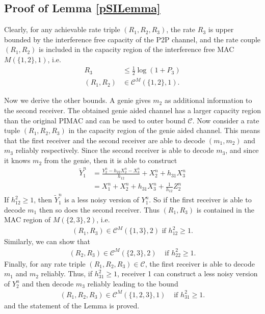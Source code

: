 \documentclass[10pt,conference]{IEEEtran}
\begin{document}







\begin{appendices}



\section{Proof of Lemma \ref{pSILemma}}
\label{pSILemmaProof}
Clearly, for any achievable rate triple $(R_1,R_2,R_3)$, the rate $R_3$ is upper bounded by the interference free capacity of the P2P channel, and the rate couple $(R_1,R_2)$ is included in the  capacity region of the interference free MAC $M(\{1,2\},1)$, i.e. 
\begin{align}
R_3&\leq\frac{1}{2}\log(1+P_3)\\
(R_1,R_2)&\in\mathcal{C}^{M}(\{1,2\},1).
\end{align}

Now we derive the other bounds. A genie gives $m_2$ as additional information to the second receiver. The obtained genie aided channel has a larger capacity region than the original PIMAC and can be used to outer bound $\mathcal{C}$. Now consider a rate tuple $(R_1,R_2,R_3)$ in the capacity region of the genie aided channel. This means that the first receiver and the second receiver are able to decode $(m_1,m_2)$ and $m_3$ reliably respectively. Since the second receiver is able to decode $m_3$, and since it knows $m_2$ from the genie, then it is able to construct 
\begin{align}
\tilde{Y}_1^n&=\frac{Y_2^n-h_{22}X_2^n-X_3^n}{h_{12}}+X_2^n+h_{31}X_3^n\nonumber\\
&=X_1^n+X_2^n+h_{31}X_3^n+\frac{1}{h_{12}}Z_2^n
\end{align}
If $h_{12}^2\geq1$, then $\tilde{Y}_1^n$ is a less noisy version of $Y_1^n$. So if the first receiver is able to decode $m_1$ then so does the second receiver. Thus
$(R_1,R_3)$ is contained in the MAC region of $M(\{2,3\},2)$, i.e. 
\begin{align}
(R_1,R_3)\in\mathcal{C}^{M}(\{1,3\},2)  \text{ if } h_{12}^2\geq1.
\end{align}
Similarly, we can show that
\begin{align}
(R_2,R_3)\in\mathcal{C}^{M}(\{2,3\},2) &\text{ if } h_{22}^2\geq1.
\end{align}
Finally, for any rate triple $(R_1,R_2,R_3)\in\mathcal{C}$, the first receiver is able to decode $m_1$ and $m_2$ reliably. Thus, if $h_{31}^2\geq1$, receiver 1 can construct a less noisy version of $Y_2^n$ and then decode $m_3$ reliably leading to the bound
\begin{align}
(R_1,R_2,R_3)\in\mathcal{C}^{M}(\{1,2,3\},1) &\text{ if } h_{31}^2\geq1.
\end{align}
and the statement of the Lemma is proved.





\end{appendices}
\end{document}
